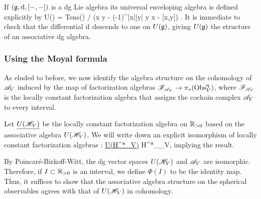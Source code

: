 \documentclass[10pt]{amsart}
\begin{document}
\begin{rmk}
If $(\mathfrak g, {\rm d}, [-,-])$ is a dg Lie algebra its universal enveloping algebra is defined explicitly by 
\ben
U(\fg) = {\rm Tens}(\fg) / (x \tensor y - (-1)^{|x||y|} y \tensor x - [x,y]) .
\een
It is immediate to check that the differential ${\rm d}$ descends to one on $U(\mathfrak g)$, giving $U(\mathfrak g)$ the structure of an associative dg algebra.
\end{rmk}

\subsubsection{Using the Moyal formula}

As eluded to before, we now identify the algebra structure on the cohomology of $\mathscr A_V$
induced by the map of factorization algebras $\mathscr F_{\mathscr A_V} \to \pi_*({\rm Obs}_V^{\rm q})$, where $\mathscr F_{\mathscr A_V}$ is the locally constant factorization algebra that assigns the cochain complex $\mathscr A_V$ to every interval.

Let $\underline{U(\mathscr H_V)}$ be the locally constant factorization algebra on $\mathbb R_{>0}$ based on the associative algebra $U(\mathscr H_V)$. 
We will write down an explicit isomorphism of locally constant factorization algebras
\ben
\Phi : \ul{U(H^*\sH_V)} \to H^*\sF_{\sA_V},
\een
implying the result. 

By Poincar\'{e}-Birkoff-Witt, the dg vector spaces $U(\mathscr H_V)$ and $\mathscr A_V$ are isomorphic. 
Therefore, if $I \subset \mathbb R_{>0}$ is an interval, we define $\Phi(I)$ to be the identity map. 
Thus, it suffices to show that the associative algebra structure on the spherical observables agrees with that of $U(\mathscr H_V)$ in cohomology.


\end{document}
